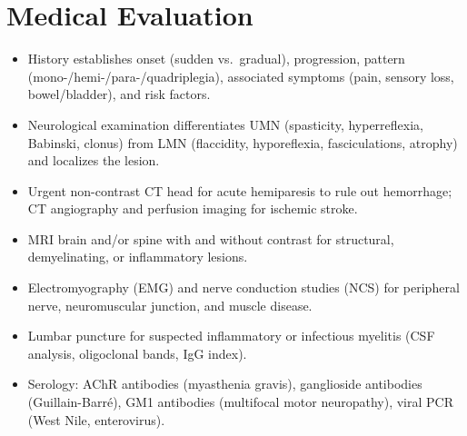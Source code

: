 \section*{Medical Evaluation}
\begin{itemize}
  \item History establishes onset (sudden vs.\ gradual), progression, pattern (mono-/hemi-/para-/quadriplegia), associated symptoms (pain, sensory loss, bowel/bladder), and risk factors.
  \item Neurological examination differentiates UMN (spasticity, hyperreflexia, Babinski, clonus) from LMN (flaccidity, hyporeflexia, fasciculations, atrophy) and localizes the lesion.
  \item Urgent non-contrast CT head for acute hemiparesis to rule out hemorrhage; CT angiography and perfusion imaging for ischemic stroke.
  \item MRI brain and/or spine with and without contrast for structural, demyelinating, or inflammatory lesions.
  \item Electromyography (EMG) and nerve conduction studies (NCS) for peripheral nerve, neuromuscular junction, and muscle disease.
  \item Lumbar puncture for suspected inflammatory or infectious myelitis (CSF analysis, oligoclonal bands, IgG index).
  \item Serology: AChR antibodies (myasthenia gravis), ganglioside antibodies (Guillain-Barr\'e), GM1 antibodies (multifocal motor neuropathy), viral PCR (West Nile, enterovirus).
\end{itemize}

